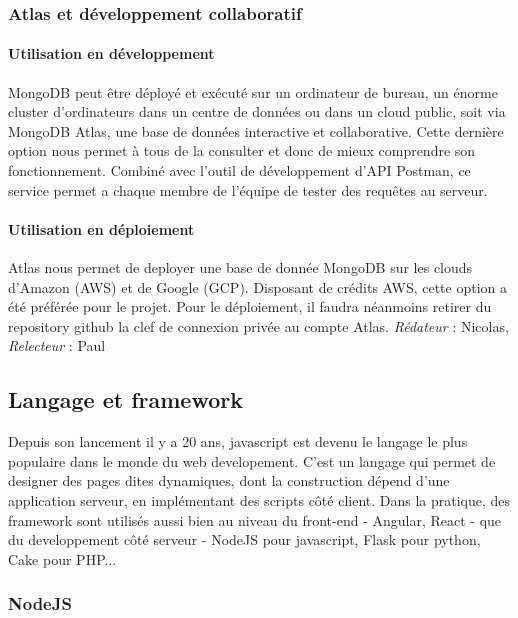 \documentclass[oneside,a4paper,13pt]{article}
\begin{document}
\subsubsection{Atlas et développement collaboratif}

\paragraph{Utilisation en développement}
MongoDB peut être déployé et exécuté sur un ordinateur de bureau, un énorme cluster d'ordinateurs dans un centre de données ou dans un cloud public, soit via MongoDB Atlas, une base de données interactive et collaborative. Cette dernière option nous permet à tous de la consulter et donc de mieux comprendre son fonctionnement. Combiné avec l'outil de développement d'API Postman, ce service permet a chaque membre de l'équipe de tester des requêtes au serveur.

\paragraph{Utilisation en déploiement}
Atlas nous permet de deployer une base de donnée MongoDB sur les clouds d'Amazon (AWS) et de Google (GCP). Disposant de crédits AWS, cette option a été préférée pour le projet. Pour le déploiement, il faudra néanmoins retirer du repository github la clef de connexion privée au compte Atlas.
\smallbreak\textit{Rédateur} : Nicolas, \textit{Relecteur} : Paul
\subsection{Langage et framework}

Depuis son lancement il y a 20 ans, javascript est devenu le langage le plus populaire dans le monde du web developement. C'est un langage qui permet de designer des pages dites dynamiques, dont la construction dépend d'une application serveur, en implémentant des scripts côté client. Dans la pratique, des framework sont utilisés aussi bien au niveau du front-end - Angular, React - que du developpement côté serveur - NodeJS pour javascript, Flask pour python, Cake pour PHP...

\subsubsection{NodeJS}
\end{document}
